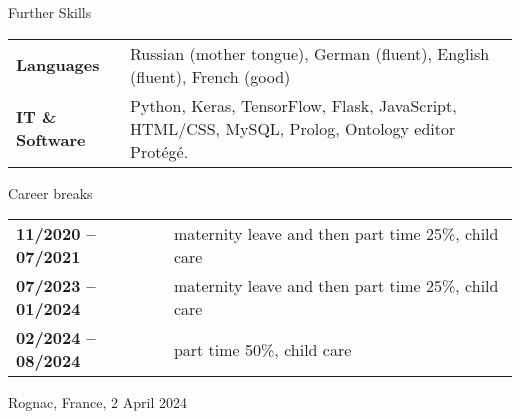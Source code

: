 \documentclass{resume} %
\begin{document}
\vspace{-10pt}

\begin{rSection}{Further Skills} 

\hspace{-20pt}
\begin{tabular}{p{3.8cm}p{13cm}}

{\bf Languages} &  Russian (mother tongue), German (fluent), English (fluent), French (good) \\[5pt]
{\bf IT \& Software} &  Python, Keras, TensorFlow, Flask, JavaScript, HTML/CSS, MySQL, Prolog, Ontology editor Prot\'eg\'e.

 
\end{tabular}

\end{rSection}

\vspace{-10pt}

\begin{rSection}{Career breaks}
	
	\hspace{-20pt}
	\begin{tabular}{p{3.8cm}p{13cm}}
		{\bf 11/2020 -- 07/2021 } & maternity leave and then part time 25\%, child care  \\[5pt]
		{\bf 07/2023 -- 01/2024 } & maternity leave and then part time 25\%, child care  \\[5pt]
		{\bf 02/2024 -- 08/2024 } & part time 50\%, child care  \\[5pt]
	\end{tabular}
\end{rSection}
\bigskip

\bigskip

Rognac, France, 2 April 2024
\end{document}
